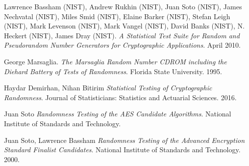 \documentclass[conference]{IEEEtran}
\begin{document}
\begin{thebibliography}{9}

Lawrence Bassham (NIST), Andrew Rukhin (NIST), Juan Soto (NIST), James Nechvatal (NIST), Miles Smid (NIST), Elaine Barker (NIST), Stefan Leigh (NIST), Mark Levenson (NIST), Mark Vangel (NIST), David Banks (NIST), N. Heckert (NIST), James Dray (NIST). 
\textit{A Statistical Test Suite for Random and Pseudorandom Number Generators for Cryptographic Applications}. 
April 2010.

George Marsaglia. 
\textit{The Marsaglia Random Number CDROM including the Diehard Battery of Tests of Randomness}. 
Florida State University. 1995.

Haydar Demirhan, Nihan Bitirim
\textit{Statistical Testing of Cryptographic Randomness}. 
Journal of Statisticians: Statistics and Actuarial Sciences. 2016.

Juan Soto
\textit{Randomness Testing of the AES Candidate Algorithms}. 
National Institute of Standards and Technology.

Juan Soto, Lawrence Bassham
\textit{Randomness Testing of the Advanced Encryption Standard Finalist Candidates}. 
National Institute of Standards and Technology. 2000.

\end{thebibliography}
\end{document}
